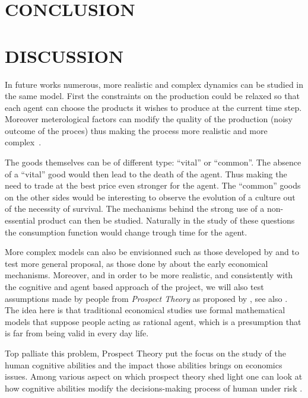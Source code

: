 \documentclass{wscpaperproc}
\begin{document}
\section{CONCLUSION}

\section{DISCUSSION}


In future works numerous, more realistic and complex dynamics can be studied in the same model. First the constraints on the production could be relaxed so that each agent can choose the products it wishes to produce at the current time step. Moreover meterological factors can modify the quality of the production (noisy outcome of the proces) thus making the process more realistic and more complex~\cite{bentley_specialisation_2005}.

The goods themselves can be of different type: ``vital'' or ``common''. The absence of a ``vital'' good would then lead to the death of the agent. Thus making the need to trade at the best price even stronger for the agent. The ``common'' goods on the other sides would be interesting to observe the evolution of a culture out of the necessity of survival. The mechanisms behind the strong use of a non-essential product can then be studied. Naturally in the study of these questions the consumption function would change trough time for the agent.

More complex models can also be envisionned such as those developed by 
\cite{rubinstein_equilibrium_1985} and to test more general proposal, as those done by \cite{polanyi_trade_1957,polanyi_livelihood_1977} about the early economical mechanisms. Moreover, and in order to be more realistic, and consistently with the cognitive and agent based approach of the project, we will also test assumptions made by people from \emph{Prospect Theory} as proposed by 
\cite{kahneman_prospect_1979}, see also
\cite{camerer_prospect_2004}. The idea here is that traditional economical studies use formal mathematical models that suppose people acting as rational agent, which is a presumption that is far from being valid  in every day life. 

Top palliate this problem, Prospect Theory put the focus on the study of the human cognitive abilities and the impact those abilities brings on economics issues. Among various aspect on which prospect theory shed light one can look at how cognitive abilities modify the decisions-making process of human under risk
\cite{weber_disposition_1998}.
\end{document}
